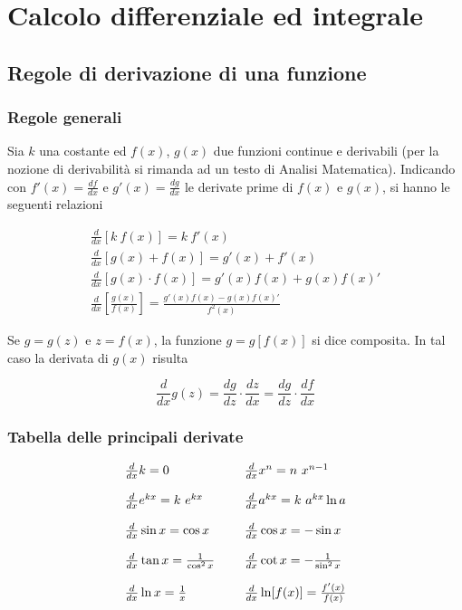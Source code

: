 \chapter{Calcolo differenziale ed integrale}

\section{Regole di derivazione di una funzione}

\subsection*{Regole generali}

Sia $\displaystyle k$ una costante ed $\displaystyle f( x)$, $\displaystyle g( x)$ due funzioni continue e derivabili (per la nozione di derivabilità si rimanda ad un testo di Analisi Matematica). Indicando con $\displaystyle f'( x) =\frac{df}{dx}$ e $\displaystyle g'( x) =\frac{dg}{dx}$ le derivate prime di $\displaystyle f( x)$ e $\displaystyle g( x)$, si hanno le seguenti relazioni

\begin{equation*}
	\begin{array}{ c }
		\frac{d}{dx}[ k\ f( x)] =k\ f'( x)\\
		[4mm]
		\frac{d}{dx}[ g( x) +f( x)] =g'( x) +f'( x)\\
		[4mm]
		\frac{d}{dx}[ g( x) \cdot f( x)] =g'( x) f( x) +g( x) f( x) '\\
		[4mm]
		\frac{d}{dx}\left[\frac{g( x)}{f( x)}\right] =\frac{g'( x) f( x) -g( x) f( x) '}{f^2( x)}
	\end{array}
\end{equation*}

Se $\displaystyle g=g( z)$ e $\displaystyle z=f( x)$, la funzione $\displaystyle g=g[ f( x)]$ si dice composita. In tal caso la derivata di $\displaystyle g( x)$ risulta

\begin{equation*}
	\frac{d}{dx} g( z) =\frac{dg}{dz} \cdot \frac{dz}{dx} =\frac{dg}{dz} \cdot \frac{df}{dx}
\end{equation*}

\subsection*{Tabella delle principali derivate}

\begin{equation*}
	\begin{array}{ l l }
		\frac{d}{dx} k=0 & \frac{d}{dx} x^n =n\ x^{n-1}\\
		[4mm]
		\frac{d}{dx} e^{kx} =k\ e^{kx} & \frac{d}{dx} a^{kx} =k\ a^{kx}\ln a\\
		[4mm]
		\frac{d}{dx}\sin x=\cos x & \frac{d}{dx}\cos x=-\sin x\\
		[4mm]
		\frac{d}{dx}\tan x=\frac{1}{\cos^2 x} \ \ \ \  & \frac{d}{dx}\cot x=-\frac{1}{\sin^2 x}\\
		[4mm]
		\frac{d}{dx}\ln x=\frac{1}{x} & \frac{d}{dx}\ln[ f( x)] =\frac{f'( x)}{f( x)}
	\end{array}
\end{equation*}

